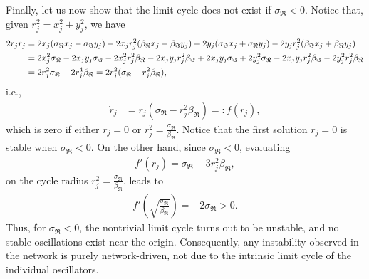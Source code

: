 \documentclass[aps,showpacs,preprintnumbers,amsmath,amssymb,twocolumn,superscriptaddress,floatfix,nofootinbib,10pt,pre]{revtex4-1}
\begin{document}
Finally, let us now show that the limit cycle does not exist if $\sigma_{\Re}<0$. Notice that, given $r_j^2=x_j^2+y_j^2$, we have
\begin{align}
    2r_j\dot{r}_j&=2x_j(\sigma_{\Re} x_j-\sigma_{\Im} y_j)-2x_jr^2_j(\beta_{\Re} x_j-\beta_{\Im} y_j) + 2y_j(\sigma_{\Im} x_j+\sigma_{\Re} y_j) -2y_jr^2_j(\beta_{\Im} x_j+\beta_{\Re} y_j)\notag\\
    &= 2x_j^2\sigma_{\Re} -2x_jy_j\sigma_{\Im} -2x_j^2r^2_j\beta_{\Re} -2x_jy_jr^2_j\beta_{\Im} +2x_jy_j\sigma_{\Im}+2y_j^2\sigma_{\Re}-2x_jy_jr^2_j\beta_{\Im}-2y^2_jr^2_j\beta_{\Re}\notag\\
    &= 2r^2_j\sigma_{\Re}-2r^4_j\beta_{\Re}=2r_j^2(\sigma_{\Re}-r^2_j\beta_{\Re}),
\end{align}
i.e.,
\begin{align}
    \dot{r}_j &= r_j(\sigma_{\Re}-r^2_j\beta_{\Re}) =: f(r_j),
\end{align}
which is zero if either $r_j=0$ or $r^2_j=\frac{\sigma_{\Re}}{\beta_{\Re}}$. Notice that the first solution $r_j=0$ is stable when $\sigma_{\Re}<0$. On the other hand, since $\sigma_{\Re}<0$, evaluating
\begin{align}
    f'(r_j) = \sigma_{\Re}-3r_j^2\beta_{\Re},
\end{align}
on the cycle radius $r^2_j=\frac{\sigma_{\Re}}{\beta_{\Re}}$, leads to
\begin{align}
    f'\left(\sqrt{\frac{\sigma_{\Re}}{\beta_{\Re}}}\right)=-2\sigma_{\Re}>0.
\end{align}
Thus, for $\sigma_{\Re}<0$, the nontrivial limit cycle turns out to be unstable, and no stable oscillations exist near the origin. Consequently, any instability observed in the network is purely network-driven, not due to the intrinsic limit cycle of the individual oscillators.


\end{document}
